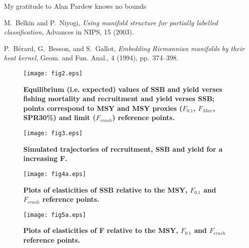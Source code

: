 \documentclass{pnastwo}
\begin{document}
\begin{article}
\begin{acknowledgments}
My gratitude to Alan Pardew knows no bounds
\end{acknowledgments}

\begin{thebibliography}{10}
M.~Belkin and P.~Niyogi, {\em Using manifold structure for partially
  labelled classification}, Advances in NIPS, 15 (2003).

P.~B\'erard, G.~Besson, and S.~Gallot, {\em Embedding {R}iemannian
  manifolds by their heat kernel}, Geom. and Fun. Anal., 4 (1994),
  pp.~374--398.
\end{thebibliography}
\end{article}

\begin{figure*}[ht]
\begin{center}
\centerline{\texttt{[image: fig2.eps]}}
\end{center}
\caption{\bf{Equilibrium (i.e. expected) values of SSB and yield verses fishing mortality and recruitment and yield verses SSB; points correspond to
MSY and MSY proxies ($F_{0.1}$, $F_{Max}$, SPR30\%) and limit ($F_{crash}$) reference points.}}
\label{fig:brp}
\end{figure*}

\begin{figure*}[ht]
\begin{center}
\centerline{\texttt{[image: fig3.eps]}}
\end{center}
\caption{\bf{Simulated trajectories of recruitment, SSB and yield for a increasing F.}}
\label{fig:kobe}
\end{figure*}


\begin{figure*}[ht]
\begin{center}
\centerline{\texttt{[image: fig4a.eps]}}
\end{center}
\caption{\bf{Plots of elasticities of SSB relative to the MSY, $F_{0.1}$ and $F_{crash}$ reference points.}}
\label{fig:elasssbAll}
\end{figure*}


\begin{figure*}[ht]
\begin{center}
\centerline{\texttt{[image: fig5a.eps]}}
\end{center}
\caption{\bf{Plots of elasticities of F relative to the MSY, $F_{0.1}$ and $F_{crash}$ reference points.}}
\label{fig:elasfAll}
\end{figure*}
\end{document}
